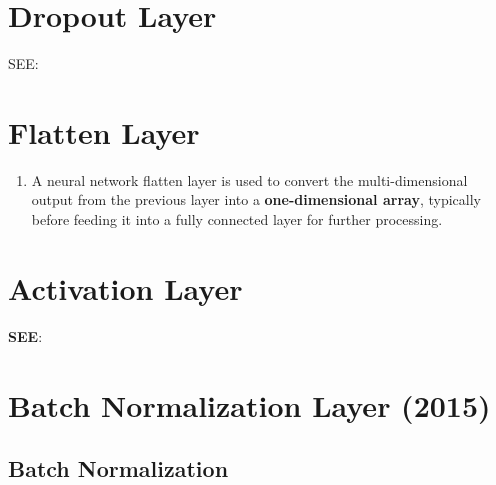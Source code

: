 
\section{Dropout Layer}\label{nn: Dropout Layer}

SEE: 





\section{Flatten Layer \cite{gfg/what-is-a-neural-network-flatten-layer}}\label{Flatten Layer}

\begin{enumerate}
    \item A neural network flatten layer is used to convert the multi-dimensional output from the previous layer into a \textbf{one-dimensional array}, typically before feeding it into a fully connected layer for further processing.

    
\end{enumerate}



\section{Activation Layer}
\textbf{SEE}: 



\section{Batch Normalization Layer (2015) \cite{dnn-1,arxiv/1502.03167-batch-normalization}} \label{Batch Normalization Layer}

\subsection{Batch Normalization \cite{dnn-1}} \label{Batch Normalization}

